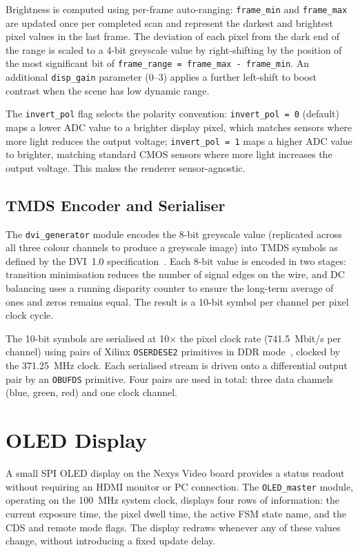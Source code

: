 Brightness is computed using per-frame auto-ranging: \texttt{frame\_min} and \texttt{frame\_max} are updated once per completed scan and represent the darkest and brightest pixel values in the last frame. The deviation of each pixel from the dark end of the range is scaled to a 4-bit greyscale value by right-shifting by the position of the most significant bit of \texttt{frame\_range = frame\_max - frame\_min}. An additional \texttt{disp\_gain} parameter (0--3) applies a further left-shift to boost contrast when the scene has low dynamic range.

The \texttt{invert\_pol} flag selects the polarity convention: \texttt{invert\_pol = 0} (default) maps a lower ADC value to a brighter display pixel, which matches sensors where more light reduces the output voltage; \texttt{invert\_pol = 1} maps a higher ADC value to brighter, matching standard CMOS sensors where more light increases the output voltage. This makes the renderer sensor-agnostic.

\subsection{TMDS Encoder and Serialiser}

The \texttt{dvi\_generator} module encodes the 8-bit greyscale value (replicated across all three colour channels to produce a greyscale image) into TMDS symbols as defined by the DVI~1.0 specification~\cite{dvi10}. Each 8-bit value is encoded in two stages: transition minimisation reduces the number of signal edges on the wire, and DC balancing uses a running disparity counter to ensure the long-term average of ones and zeros remains equal. The result is a 10-bit symbol per channel per pixel clock cycle.

The 10-bit symbols are serialised at 10$\times$ the pixel clock rate (741.5~Mbit/s per channel) using pairs of Xilinx \texttt{OSERDESE2} primitives in DDR mode~\cite{ug471}, clocked by the 371.25~MHz clock. Each serialised stream is driven onto a differential output pair by an \texttt{OBUFDS} primitive. Four pairs are used in total: three data channels (blue, green, red) and one clock channel.


\section{OLED Display}

A small SPI OLED display on the Nexys Video board provides a status readout without requiring an HDMI monitor or PC connection. The \texttt{OLED\_master} module, operating on the 100~MHz system clock, displays four rows of information: the current exposure time, the pixel dwell time, the active FSM state name, and the CDS and remote mode flags. The display redraws whenever any of these values change, without introducing a fixed update delay.

